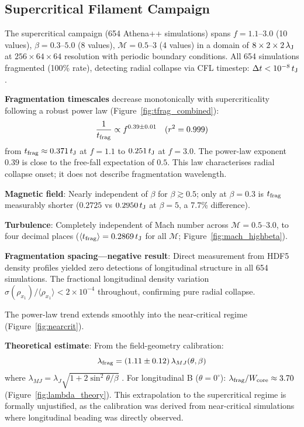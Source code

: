 \documentclass[twoside,twocolumn]{mnras}
\begin{document}
\subsection{Supercritical Filament Campaign}
\label{sec:supercrit}

The supercritical campaign (654 Athena++ simulations) spans $f = 1.1$--$3.0$ (10 values),
$\beta = 0.3$--$5.0$ (8 values), $\mathcal{M} = 0.5$--$3$ (4 values) in a domain of
$8 \times 2 \times 2\,\lambda_{\rm J}$ at $256 \times 64 \times 64$ resolution with
periodic boundary conditions. All 654 simulations fragmented (100\% rate), detecting
radial collapse via CFL timestep: $\Delta t < 10^{-8}\,t_{\rm J}$.

\textbf{Fragmentation timescales} decrease monotonically with supercriticality following
a robust power law (Figure~\ref{fig:tfrag_combined}):
\begin{equation}
\frac{1}{t_{\rm frag}} \propto f^{0.39 \pm 0.01} \quad (r^2 = 0.999)
\label{eq:powerlaw}
\end{equation}
from $t_{\rm frag} \approx 0.371\,t_{\rm J}$ at $f = 1.1$ to $0.251\,t_{\rm J}$ at
$f = 3.0$. The power-law exponent $0.39$ is close to the free-fall expectation of $0.5$.
This law characterises radial collapse onset; it does not describe fragmentation wavelength.

\textbf{Magnetic field}: Nearly independent of $\beta$ for $\beta \gtrsim 0.5$; only
at $\beta = 0.3$ is $t_{\rm frag}$ measurably shorter ($0.2725$ vs $0.2950\,t_{\rm J}$
at $\beta = 5$, a 7.7\% difference).

\textbf{Turbulence}: Completely independent of Mach number across $\mathcal{M} = 0.5$--$3.0$,
to four decimal places ($\langle t_{\rm frag} \rangle = 0.2869\,t_{\rm J}$ for all $\mathcal{M}$;
Figure~\ref{fig:mach_highbeta}).

\textbf{Fragmentation spacing---negative result}: Direct measurement from HDF5 density
profiles yielded zero detections of longitudinal structure in all 654 simulations.
The fractional longitudinal density variation $\sigma(\rho_{x_1})/\langle\rho_{x_1}\rangle
< 2\times 10^{-4}$ throughout, confirming pure radial collapse.

The power-law trend extends smoothly into the near-critical regime
(Figure~\ref{fig:nearcrit}).

\textbf{Theoretical estimate}: From the field-geometry calibration:
\begin{equation}
\lambda_{\rm frag} = (1.11 \pm 0.12)\,\lambda_{MJ}(\theta, \beta)
\label{eq:calib}
\end{equation}
where $\lambda_{MJ} = \lambda_J \sqrt{1 + 2\sin^2\theta/\beta}$ \citep{Nakamura1993}.
For longitudinal B ($\theta = 0^\circ$): $\lambda_{\rm frag}/W_{\rm core} \approx 3.70$
(Figure~\ref{fig:lambda_theory}).
This extrapolation to the supercritical regime is formally unjustified, as the calibration
was derived from near-critical simulations where longitudinal beading was directly observed.
\end{document}
